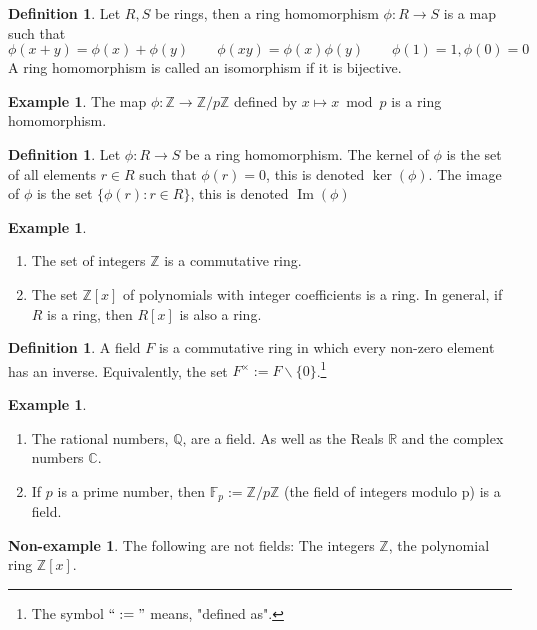 \documentclass[11pt,a4paper]{report}
\theoremstyle{plain}
\theoremstyle{definition}
\newtheorem{definition}[subsection]{Definition}
\newtheorem{exmp}[subsection]{Example}
\newtheorem{nexmp}[subsection]{Non-example}
\theoremstyle{definition}
\newcommand{\ZZ}{\mathbb{Z}}
\newcommand{\RR}{\mathbb{R}}
\def\CC{\mathbb{C}}
\def\FF{\mathbb{F}}
\def\QQ{\mathbb{Q}}
\DeclareMathOperator{\im}{Im}
\begin{document}
	\begin{definition}
		Let $R,S$ be rings, then a ring homomorphism  $\phi:R \to S$ is a map such that \[\phi(x+y)=\phi(x)+\phi(y) \qquad \phi(xy)=\phi(x)\phi(y) \qquad \phi(1)=1, \phi(0)=0\]
		A ring homomorphism is called an isomorphism if it is bijective.
	\end{definition}
	\begin{exmp}
		The map $\phi: \ZZ \to \ZZ/p\ZZ$ defined by  $x \mapsto x \bmod p$ is a ring homomorphism.
	\end{exmp}
	\begin{definition}
		Let $\phi: R \to S$ be a ring homomorphism. The kernel of $\phi$ is the set of all elements $r \in R$ such that $\phi(r)=0$, this is denoted $\ker(\phi)$. The image of $\phi$ is the set $\{\phi(r): r \in R\}$, this is denoted $\im(\phi)$
	\end{definition}
	
	
	
	\begin{exmp}
		\begin{enumerate}
			\item The set of integers $\ZZ$ is a commutative ring.
			\item The set $\ZZ[x]$ of polynomials with integer coefficients is a ring. In general, if $R$ is a ring, then $R[x]$ is also a ring. 
		\end{enumerate}
	\end{exmp}
	
	\begin{definition}
		A field $F$ is a commutative ring in which every  non-zero element has an inverse. Equivalently, the set $F^{\times}:=F \backslash\{0\}$.\footnote{The symbol $``:="$ means, "defined as".}
	\end{definition}
	\begin{exmp}
		\begin{enumerate}
			\item The rational numbers, $\QQ$, are a field. As well as the Reals $\RR$ and the complex numbers $\CC$.
			\item If $p$ is a prime number, then $\FF_p:=\ZZ/p\ZZ$ (the field of integers modulo p) is a field.
			
		\end{enumerate}
	\end{exmp}	
	
	\begin{nexmp}
		The following are not fields: The integers $\ZZ$, the polynomial ring $\ZZ[x]$.
	\end{nexmp}
	
\end{document}
